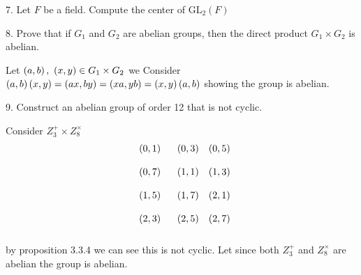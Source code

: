 \begin{mdframed}[style=darkQuesion]
  7. Let $F$ be a field. Compute the center of $\mathrm{GL}_{2}(F)$
\end{mdframed}
\begin{mdframed}[style=darkAnswer,frametitle={Joe Starr}]
\end{mdframed}
\newpage
\begin{mdframed}[style=darkQuesion]
  8. Prove that if $G_{1}$ and $G_{2}$ are abelian groups, then the direct product $G_{1} \times G_{2}$ is abelian.
\end{mdframed}
\begin{mdframed}[style=darkAnswer,frametitle={Joe Starr}]
 Let $\left(a,b\right),\ \left(x,y\right)\in G_{1} \times G_{2}$ we Consider
  $\left(a,b\right)\left(x,y\right)=\left(ax,by\right)=\left(xa,yb\right)=\left(x,y\right)\left(a,b\right)$ showing 
  the group is abelian. 
\end{mdframed}
\newpage
\begin{mdframed}[style=darkQuesion]
  9. Construct an abelian group of order 12 that is not cyclic.
\end{mdframed}
\begin{mdframed}[style=darkAnswer,frametitle={Joe Starr}]
   Consider $Z_3^+\times Z_8^{\times}$ 
 $$  
 \begin{matrix}
     \left(0,1\right)&
     \left(0,3\right)&
     \left(0,5\right)\\ \hspace{.5in} \\
     \left(0,7\right)&
     \left(1,1\right)&
     \left(1,3\right)\\ \hspace{.5in} \\
     \left(1,5\right)&
     \left(1,7\right)&
     \left(2,1\right)\\ \hspace{.5in} \\
     \left(2,3\right)&
     \left(2,5\right)&
     \left(2,7\right)\\ \hspace{.5in} \\
  \end{matrix}
   $$
  by proposition 3.3.4 we can see this is not cyclic.
  Let since both $Z_3^+$ and $ Z_8^{\times}$ are abelian the group is abelian. 
\end{mdframed}
